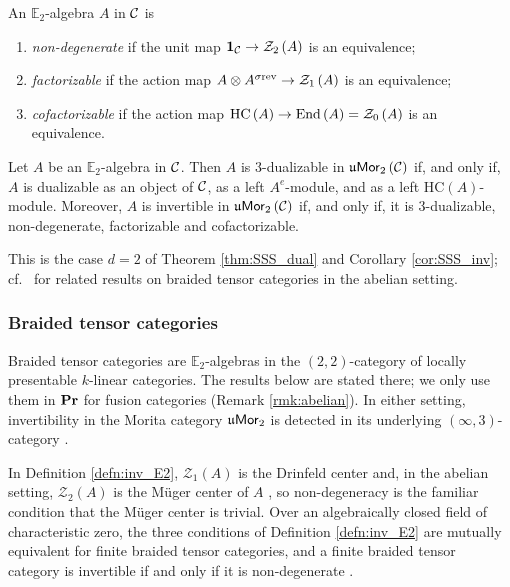 \begin{defn}
\label{defn:inv_E2}
An $\mathbb{E}_2$-algebra $A$ in $\mathcal{C}$ is
\begin{enumerate}
\item \emph{non-degenerate} if the unit map $\mathbf{1}_{\mathcal{C}}\to \mathcal{Z}_2\left(A\right)$ is an
equivalence;
\item \emph{factorizable} if the action map $A\otimes A^{\sigma\text{rev}}\to \mathcal{Z}_1\left(A\right)$ is an equivalence;
\item \emph{cofactorizable} if the action map
$\operatorname{HC}\left(A\right)\to \operatorname{End}\left(A\right)=\mathcal{Z}_0\left(A\right)$ is an equivalence.
\end{enumerate}
\end{defn}

\begin{theorem}
\label{thm:inv_E2}
Let $A$ be an $\mathbb{E}_2$-algebra in $\mathcal{C}$. Then $A$ is $3$-dualizable in
$\mathfrak{u}\mathsf{Mor}_2\left(\mathcal{C}\right)$ if, and only if, $A$ is dualizable as an object of $\mathcal{C}$, as a left
$A^e$-module, and as a left $\mathrm{HC}\left(A\right)$-module. Moreover, $A$ is invertible in
$\mathfrak{u}\mathsf{Mor}_2\left(\mathcal{C}\right)$ if, and only if, it is $3$-dualizable, non-degenerate, factorizable and
cofactorizable.
\end{theorem}

This is the case $d=2$ of Theorem \ref{thm:SSS_dual} and Corollary \ref{cor:SSS_inv}; cf.\
\cite{BJS} for related results on braided tensor categories in the abelian setting.

\subsubsection{Braided tensor categories}
\label{sec:braided}

Braided tensor categories are $\mathbb{E}_2$-algebras in the $\left(2,2\right)$-category of
locally presentable $k$-linear categories. The results below are stated there; we only use them
in $\mathbf{Pr}$ for fusion categories (Remark \ref{rmk:abelian}).
In either setting, invertibility in the
Morita category $\mathfrak{u}\mathsf{Mor}_2$ is detected in its underlying $\left(\infty , 3\right)$-category
\cite[Section 1.5]{SSS}.

In Definition \ref{defn:inv_E2}, $\mathcal{Z}_1\left(A\right)$ is the Drinfeld center and, in the abelian
setting, $\mathcal{Z}_2\left(A\right)$ is the M\"uger center of $A$ \cite[Propositions 3.6 and 3.7]{BJSS}, so non-degeneracy is the
familiar condition that the M\"uger center is trivial. Over an algebraically closed field
of characteristic zero, the three conditions of Definition \ref{defn:inv_E2} are mutually equivalent
for finite braided tensor categories, and a finite braided tensor category is invertible
if and only if it is non-degenerate \cite[Theorems 1.1 and 3.20]{BJSS}.

